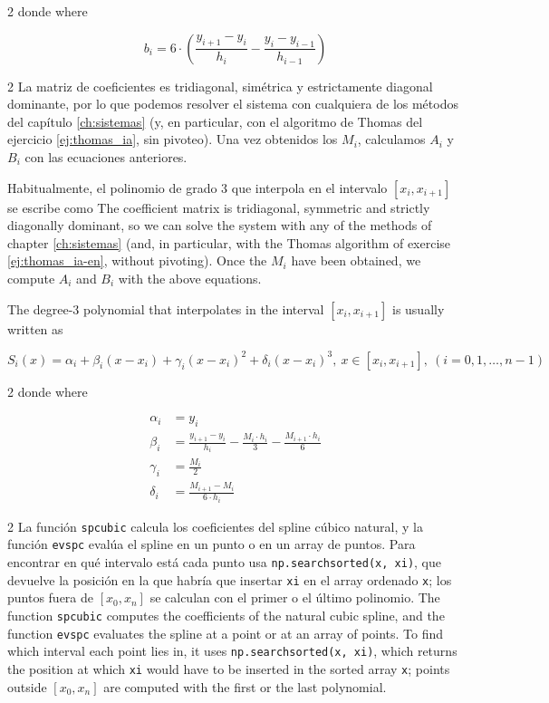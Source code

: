 \begin{paracol}{2}
donde
\switchcolumn
where
\end{paracol}
\begin{equation*}
b_i=6\cdot \left(\frac{y_{i+1}-y_i}{h_i}-\frac{y_i-y_{i-1}}{h_{i-1}}\right)
\end{equation*}
\begin{paracol}{2}
La matriz de coeficientes es tridiagonal, simétrica y estrictamente diagonal dominante, por lo que podemos resolver el sistema con cualquiera de los métodos del capítulo \ref{ch:sistemas} (y, en particular, con el algoritmo de Thomas del ejercicio \ref{ej:thomas_ia}, sin pivoteo). Una vez obtenidos los $M_i$, calculamos $A_i$ y $B_i$ con las ecuaciones anteriores.

Habitualmente, el polinomio de grado 3 que interpola en el intervalo $[x_i,x_{i+1}]$ se escribe como
\switchcolumn
The coefficient matrix is tridiagonal, symmetric and strictly diagonally dominant, so we can solve the system with any of the methods of chapter \ref{ch:sistemas} (and, in particular, with the Thomas algorithm of exercise \ref{ej:thomas_ia-en}, without pivoting). Once the $M_i$ have been obtained, we compute $A_i$ and $B_i$ with the above equations.

The degree-3 polynomial that interpolates in the interval $[x_i,x_{i+1}]$ is usually written as
\end{paracol}
\begin{equation*}
S_i(x)=\alpha_i+\beta_i(x-x_i)+\gamma_i(x-x_i)^2+\delta_i(x-x_i)^3, \ x\in [x_i,x_{i+1}],\ (i=0,1,\dots,n-1)
\end{equation*}
\begin{paracol}{2}
donde
\switchcolumn
where
\end{paracol}
\begin{align*}
\alpha_i &=y_i\\
\beta_i &=\frac{y_{i+1}-y_i}{h_i}-\frac{M_i \cdot h_i}{3}-\frac{M_{i+1} \cdot h_i}{6}\\
\gamma_i &=\frac{M_i}{2}\\
\delta_i &=\frac{M_{i+1}-M_i}{6\cdot h_i}
\end{align*}
\begin{paracol}{2}
La función \texttt{spcubic} calcula los coeficientes del spline cúbico natural, y la función \texttt{evspc} evalúa el spline en un punto o en un array de puntos. Para encontrar en qué intervalo está cada punto usa \texttt{np.searchsorted(x, xi)}, que devuelve la posición en la que habría que insertar \texttt{xi} en el array ordenado \texttt{x}; los puntos fuera de $[x_0,x_n]$ se calculan con el primer o el último polinomio.
\switchcolumn
The function \texttt{spcubic} computes the coefficients of the natural cubic spline, and the function \texttt{evspc} evaluates the spline at a point or at an array of points. To find which interval each point lies in, it uses \texttt{np.searchsorted(x, xi)}, which returns the position at which \texttt{xi} would have to be inserted in the sorted array \texttt{x}; points outside $[x_0,x_n]$ are computed with the first or the last polynomial.
\end{paracol}


